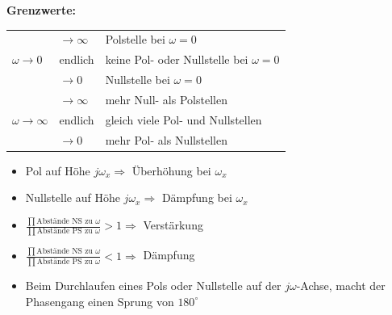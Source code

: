 \begin{minipage}{9cm}
\textbf{Grenzwerte:} \\

\begin{tabular}{|l|l|l|} \hline
\multirow{3}{*}{$\omega \rightarrow 0$} 
	& $\rightarrow \infty$ & Polstelle bei $\omega = 0$ \\
	& endlich & keine Pol- oder Nullstelle bei $\omega = 0$ \\ 
	& $\rightarrow 0$ & Nullstelle bei $\omega = 0$ \\ \hline
\multirow{3}{*}{$\omega \rightarrow \infty$} 
	& $\rightarrow \infty$ & mehr Null- als Polstellen \\
	& endlich & gleich viele Pol- und Nullstellen \\
	& $\rightarrow 0$ & mehr Pol- als Nullstellen \\ \hline
\end{tabular}
\end{minipage}
\begin{minipage}{8cm}
\begin{itemize}
  \item Pol auf Höhe $j\omega_x \Longrightarrow$ Überhöhung bei $\omega_x$
  \item Nullstelle auf Höhe $j\omega_x \Longrightarrow$ Dämpfung bei $\omega_x$
  \item $\frac{\prod{\text{Abstände NS zu 
        $\omega$}}}{\prod{\text{Abstände PS zu 
        $\omega$}}} > 1 \Longrightarrow$ Verstärkung
  \item $\frac{\prod{\text{Abstände NS zu 
        $\omega$}}}{\prod{\text{Abstände PS zu 
        $\omega$}}} < 1 \Longrightarrow$ Dämpfung
  \item Beim Durchlaufen eines Pols oder Nullstelle auf der $j\omega$-Achse, macht der Phasengang
        einen Sprung von $180^{\circ}$
\end{itemize}
\end{minipage}

\newpage 

\renewcommand{\arraystretch}{1}

